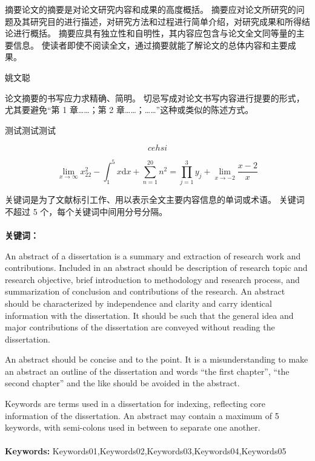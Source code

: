 
\begin{cnabstract} 
  摘要论文的摘要是对论文研究内容和成果的高度概括。
  摘要应对论文所研究的问题及其研究目的进行描述，对研究方法和过程进行简单介绍，对研究成果和所得结论进行概括。
  摘要应具有独立性和自明性，其内容应包含与论文全文同等量的主要信息。
  使读者即使不阅读全文，通过摘要就能了解论文的总体内容和主要成果。

  姚文聪

  论文摘要的书写应力求精确、简明。
  切忌写成对论文书写内容进行提要的形式，尤其要避免“第 1 章……；第 2 章……；……”这种或类似的陈述方式。

  测试测试测试
  
  $$ cehsi $$

$$  \lim_{x \to \infty} x^2_{22} - \int_{1}^{5}x\mathrm{d}x + \sum_{n=1}^{20} n^{2} = \prod_{j=1}^{3} y_{j}  + \lim_{x \to -2} \frac{x-2}{x} $$


  关键词是为了文献标引工作、用以表示全文主要内容信息的单词或术语。
  关键词不超过 5 个，每个关键词中间用分号分隔。
 \\
 \\
 \heiti \bfseries{关键词：} 
\end{cnabstract} 
  
\begin{enabstract}
  \par An abstract of a dissertation is a summary and extraction of research work and contributions.
  Included in an abstract should be description of research topic and research objective, brief introduction to methodology and research process, and summarization of conclusion and contributions of the research.
  An abstract should be characterized by independence and clarity and carry identical information with the dissertation.
  It should be such that the general idea and major contributions of the dissertation are conveyed without reading the dissertation.

  An abstract should be concise and to the point.
  It is a misunderstanding to make an abstract an outline of the dissertation and words “the first chapter”, “the second chapter” and the like should be avoided in the abstract.

  Keywords are terms used in a dissertation for indexing, reflecting core information of the dissertation.
  An abstract may contain a maximum of 5 keywords, with semi-colons used in between to separate one another.
  \\
  \\
  \textbf{Keywords:} {Keywords01,Keywords02,Keywords03,Keywords04,Keywords05}
\end{enabstract}

